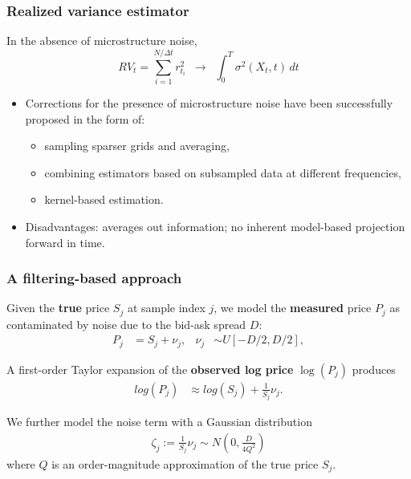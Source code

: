 \documentclass{beamer}
\begin{document}
\begin{frame}
  \frametitle{Realized variance estimator}
  In the absence of microstructure noise, 
  \[
    RV_t = \sum_{i=1}^{N/\Delta t} r_{t_i}^2 \,\,\, \to \,\,\, \displaystyle \int_{0}^T \sigma^2\left(X_t, t\right)\, dt
  \]
  
  \begin{itemize}
  \item Corrections for the presence of microstructure noise have been
    successfully proposed in the form of:
    \begin{itemize}
    \item sampling sparser grids and averaging,
    \item combining estimators based on subsampled data at different frequencies,
    \item kernel-based estimation.
    \end{itemize}
  \item Disadvantages: averages out information; no inherent
    model-based projection forward in time.
  \end{itemize}
\end{frame}
\begin{frame}
  \frametitle{A filtering-based approach} Given the \textbf{true}
  price $S_j$ at sample index $j$, we model the \textbf{measured} price $P_j$ as contaminated by noise due to the bid-ask spread $D$:
  \begin{align*}
    P_j &= S_j + \nu_j,& \nu_j &\sim U[-D/2, D/2],
  \end{align*}

  A first-order Taylor expansion of the \textbf{observed log price} $\log(P_j)$ produces
  \begin{align*}
    log(P_j) &\approx log(S_j) + \frac{1}{S_j}\nu_j.
  \end{align*}

  We further model the noise term with a Gaussian distribution
  \begin{align*}
    \zeta_j := \frac{1}{S_j}\nu_j \sim N\left(0, \frac{D}{4Q^2} \right)
  \end{align*}
  where $Q$ is an order-magnitude approximation of the true price
  $S_j$.
\end{frame}
\end{document}
